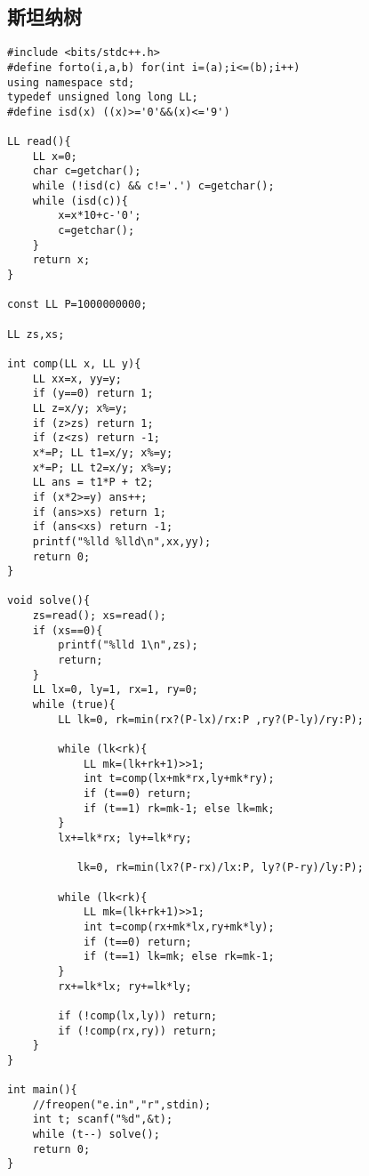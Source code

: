 \documentclass{article}
\begin{document}
\subsection{斯坦纳树}
\begin{lstlisting}
#include <bits/stdc++.h>
#define forto(i,a,b) for(int i=(a);i<=(b);i++)
using namespace std;
typedef unsigned long long LL;
#define isd(x) ((x)>='0'&&(x)<='9')

LL read(){
	LL x=0;
	char c=getchar();
	while (!isd(c) && c!='.') c=getchar();
	while (isd(c)){
		x=x*10+c-'0';
		c=getchar();
	}
	return x;
}

const LL P=1000000000;

LL zs,xs;

int comp(LL x, LL y){
	LL xx=x, yy=y;
	if (y==0) return 1;
	LL z=x/y; x%=y;
	if (z>zs) return 1;
	if (z<zs) return -1;
	x*=P; LL t1=x/y; x%=y;
	x*=P; LL t2=x/y; x%=y;
	LL ans = t1*P + t2;
	if (x*2>=y) ans++;
	if (ans>xs) return 1;
	if (ans<xs) return -1;
	printf("%lld %lld\n",xx,yy);
	return 0;
}

void solve(){
	zs=read(); xs=read();
	if (xs==0){
		printf("%lld 1\n",zs);
		return;
	}
	LL lx=0, ly=1, rx=1, ry=0;
	while (true){
		LL lk=0, rk=min(rx?(P-lx)/rx:P ,ry?(P-ly)/ry:P);
		
		while (lk<rk){
			LL mk=(lk+rk+1)>>1;
			int t=comp(lx+mk*rx,ly+mk*ry);
			if (t==0) return;
			if (t==1) rk=mk-1; else lk=mk;
		}
		lx+=lk*rx; ly+=lk*ry;
		
		   lk=0, rk=min(lx?(P-rx)/lx:P, ly?(P-ry)/ly:P);
		
		while (lk<rk){
			LL mk=(lk+rk+1)>>1;
			int t=comp(rx+mk*lx,ry+mk*ly);
			if (t==0) return;
			if (t==1) lk=mk; else rk=mk-1;
		}
		rx+=lk*lx; ry+=lk*ly;
		
		if (!comp(lx,ly)) return;
		if (!comp(rx,ry)) return;
	}
}

int main(){
	//freopen("e.in","r",stdin);
	int t; scanf("%d",&t);
	while (t--) solve();
	return 0;
}
\end{lstlisting}
\end{document}

